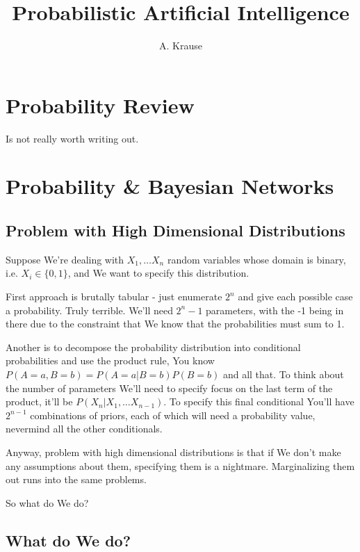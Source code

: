 \documentclass{article}
\begin{document}
\title{Probabilistic Artificial Intelligence}
\author{A. Krause}
\date{}

\maketitle

\section{Probability Review}

	Is not really worth writing out.
						

\section{Probability \& Bayesian Networks}

	\subsection{Problem with High Dimensional Distributions}
	
		Suppose We're dealing with $X_1,\ldots X_n$ random variables whose domain is binary, i.e. $X_i \in \{0 ,1 \}$, and We want to specify this distribution. 
		
		First approach is brutally tabular - just enumerate $2^n$ and give each possible case a probability. Truly terrible. We'll need $2^n-1$ parameters, with the -1 being in there due to the constraint that We know that the probabilities must sum to 1.
		
		Another is to decompose the probability distribution into conditional probabilities and use the product rule, You know $P(A=a, B=b) = P(A=a|B=b)P(B=b)$ and all that. To think about the number of parameters We'll need to specify focus on the last term of the product, it'll be $P(X_n|X_1,\ldots X_{n-1})$. To specify this final conditional You'll have $2^{n-1}$ combinations of priors, each of which will need a probability value, nevermind all the other conditionals. 
		
		Anyway, problem with high dimensional distributions is that if We don't make any assumptions about them, specifying them is a nightmare. Marginalizing them out runs into the same problems.
		
		So what do We do?
		
	\subsection{What do We do?}
	
\end{document}

